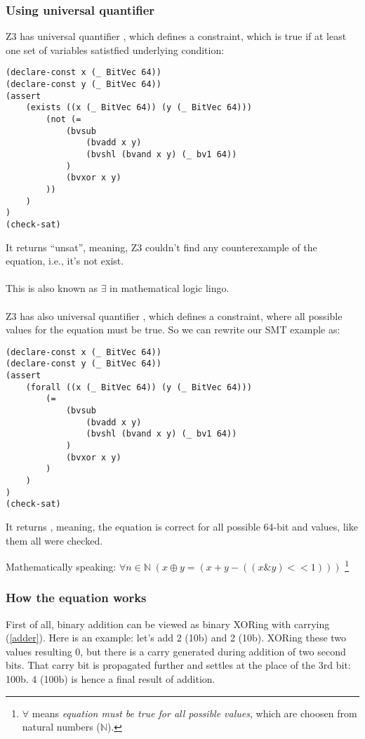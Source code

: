 \subsubsection{Using universal quantifier}

Z3 has universal quantifier , which defines a constraint, which is true if at least one set of variables satistfied underlying condition:

\begin{lstlisting}
(declare-const x (_ BitVec 64))
(declare-const y (_ BitVec 64))
(assert 
	(exists ((x (_ BitVec 64)) (y (_ BitVec 64)))
		(not (=
			(bvsub 
				(bvadd x y)
				(bvshl (bvand x y) (_ bv1 64))
			)
			(bvxor x y)
		))
	)
)
(check-sat)
\end{lstlisting}

It returns ``unsat'', meaning, Z3 couldn't find any counterexample of the equation, i.e., it's not exist.\\
\\
This is also known as $\exists$ in mathematical logic lingo.\\
\\
Z3 has also universal quantifier , which defines a constraint, where all possible values for the equation must be true.
So we can rewrite our SMT example as:

\begin{lstlisting}
(declare-const x (_ BitVec 64))
(declare-const y (_ BitVec 64))
(assert 
	(forall ((x (_ BitVec 64)) (y (_ BitVec 64)))
		(=
			(bvsub 
				(bvadd x y)
				(bvshl (bvand x y) (_ bv1 64))
			)
			(bvxor x y)
		)
	)
)
(check-sat)
\end{lstlisting}

It returns , meaning, the equation is correct for all possible 64-bit  and  values, like them all were checked.

Mathematically speaking: $\forall n\!\in\!\mathbb{N}\; (x \oplus y = (x + y - ((x \& y)<<1)))$
\footnote{
$\forall$ means \textit{equation must be true for all possible values}, which are choosen from natural numbers ($\mathbb{N}$).}

\subsubsection{How the equation works}

First of all, binary addition can be viewed as binary XORing with carrying (\ref{adder}).
Here is an example: let's add 2 (10b) and 2 (10b).
XORing these two values resulting 0, but there is a carry generated during addition of two second bits.
That carry bit is propagated further and settles at the place of the 3rd bit: 100b.
4 (100b) is hence a final result of addition.

